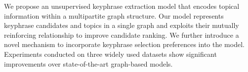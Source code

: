 We propose an unsupervised keyphrase extraction model that encodes topical information within a multipartite graph structure. Our model represents keyphrase candidates and topics in a single graph and exploits their mutually reinforcing relationship to improve candidate ranking. We further introduce a novel mechanism to incorporate keyphrase selection preferences into the model. Experiments conducted on three widely used datasets show significant improvements over state-of-the-art graph-based models.
